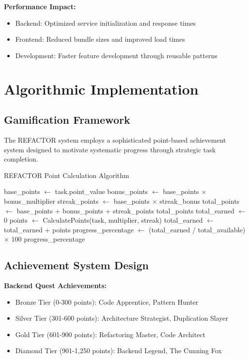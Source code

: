 \documentclass[10pt]{article}
\begin{document}
\textbf{Performance Impact:}
\begin{itemize}
    \item Backend: Optimized service initialization and response times
    \item Frontend: Reduced bundle sizes and improved load times
    \item Development: Faster feature development through reusable patterns
\end{itemize}

\section{Algorithmic Implementation}

\subsection{Gamification Framework}

The REFACTOR system employs a sophisticated point-based achievement system designed to motivate systematic progress through strategic task completion.

\begin{algorithm}
\caption{REFACTOR Point Calculation Algorithm}
\begin{algorithmic}[1]
    \State base\_points $\gets$ task.point\_value
    \State bonus\_points $\gets$ base\_points $\times$ bonus\_multiplier
    \State streak\_points $\gets$ base\_points $\times$ streak\_bonus
    \State total\_points $\gets$ base\_points + bonus\_points + streak\_points
    \Return total\_points
\EndFunction
\Statex
{}
    \State total\_earned $\gets$ 0
        \State points $\gets$ CalculatePoints(task, multiplier, streak)
        \State total\_earned $\gets$ total\_earned + points
    \EndFor
    \State progress\_percentage $\gets$ (total\_earned / total\_available) $\times$ 100
    \Return progress\_percentage
\EndFunction
\end{algorithmic}
\end{algorithm}

\subsection{Achievement System Design}

\textbf{Backend Quest Achievements:}
\begin{itemize}
    \item Bronze Tier (0-300 points): Code Apprentice, Pattern Hunter
    \item Silver Tier (301-600 points): Architecture Strategist, Duplication Slayer
    \item Gold Tier (601-900 points): Refactoring Master, Code Architect
    \item Diamond Tier (901-1,250 points): Backend Legend, The Cunning Fox
\end{itemize}
\end{document}
